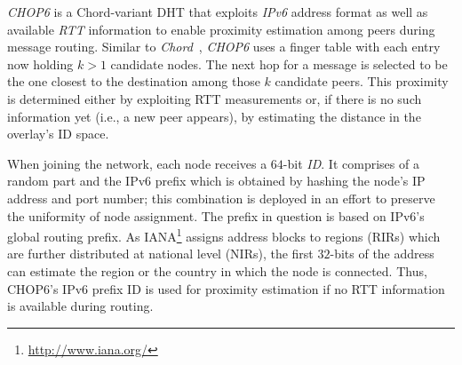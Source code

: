\emph{CHOP6} \cite{MT2007} is a Chord-variant DHT that exploits
{\sl IPv6} address format as well as available \emph{RTT} information to 
enable proximity estimation among peers during message routing.
Similar to \emph{Chord}~\cite{stoica_chord_2001}, 
\emph{CHOP6} uses a finger table with each entry now holding $k$$>$$1$ candidate
nodes. 
The next hop for a message is selected to be the one closest to the
destination among those $k$ candidate peers. 
This proximity is determined either
by exploiting RTT measurements or, if there is no such information yet 
(i.e., a new peer appears), by
estimating the distance in the overlay's ID space. 

When joining the network, each node
receives a $64$-bit \emph{ID}. 
It comprises of a random part and the IPv6 prefix which 
is obtained by hashing the node's IP address and port
number; this combination is deployed in an effort  
to preserve the uniformity of node assignment. 
The prefix in question is based on IPv6's global routing prefix.
As IANA\footnote{\url{http://www.iana.org/}}  
assigns address blocks to regions (RIRs) which are further
distributed at national level (NIRs), the first $32$-bits of the address
can estimate the region or the country in which the node is connected. 
Thus, CHOP6's IPv6 prefix ID is used for proximity estimation
if no RTT information is available during routing. 
%
